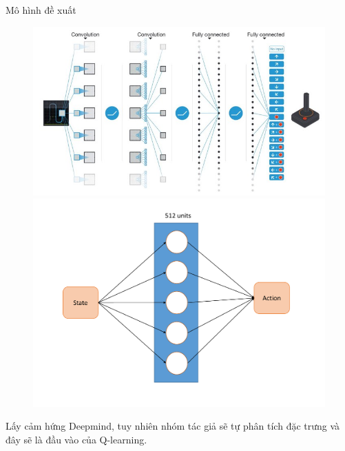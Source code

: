 \documentclass{beamer}
\begin{document}
\begin{frame}{Mô hình đề xuất}
	\begin{figure}
		\centering
		\includegraphics[width=.49\linewidth]{Pic/slide/atari-architect}
		\includegraphics[width=.49\linewidth]{Pic/baseline/baseline_archetect}
	\end{figure}
	Lấy cảm hứng Deepmind, tuy nhiên nhóm tác giả sẽ tự phân tích đặc trưng và đây sẽ là đầu vào của Q-learning.
\end{frame}
\end{document}
